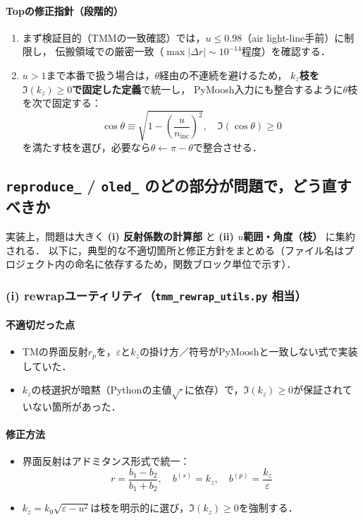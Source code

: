 \paragraph{Topの修正指針（段階的）}
\begin{enumerate}
\item まず検証目的（TMMの一致確認）では，\textbf{$u\le 0.98$}（air light-line手前）に制限し，
      伝搬領域での厳密一致（$\max|\Delta r|\sim 10^{-14}$程度）を確認する．
\item $u>1$まで本番で扱う場合は，$\theta$経由の不連続を避けるため，
      \textbf{$k_z$枝を$\Im(k_z)\ge 0$で固定した定義}で統一し，
      PyMoosh入力にも整合するように$\theta$枝を次で固定する：
      \[
      \cos\theta \equiv \sqrt{1-\left(\frac{u}{n_{\mathrm{inc}}}\right)^2},\quad
      \Im(\cos\theta)\ge 0
      \]
      を満たす枝を選び，必要なら$\theta\leftarrow\pi-\theta$で整合させる．
\end{enumerate}

\subsection{\texttt{reproduce\_\*\*} / \texttt{oled\_\*\*} のどの部分が問題で，どう直すべきか}

実装上，問題は大きく \textbf{(i) 反射係数の計算部} と \textbf{(ii) $u$範囲・角度（枝）} に集約される．
以下に，典型的な不適切箇所と修正方針をまとめる（ファイル名はプロジェクト内の命名に依存するため，関数ブロック単位で示す）．

\subsubsection{(i) rewrapユーティリティ（\texttt{tmm\_rewrap\_utils.py} 相当）}
\paragraph{不適切だった点}
\begin{itemize}
\item TMの界面反射$r_p$を，$\varepsilon$と$k_z$の掛け方／符号がPyMooshと一致しない式で実装していた．
\item $k_z$の枝選択が暗黙（Pythonの主値$\sqrt{\cdot}$に依存）で，$\Im(k_z)\ge 0$が保証されていない箇所があった．
\end{itemize}

\paragraph{修正方法}
\begin{itemize}
\item 界面反射はアドミタンス形式で統一：
      \[
      r=\frac{b_1-b_2}{b_1+b_2},\quad
      b^{(s)}=k_z,\quad b^{(p)}=\frac{k_z}{\varepsilon}
      \]
\item $k_z=k_0\sqrt{\varepsilon-u^2}$は枝を明示的に選び，$\Im(k_z)\ge 0$を強制する．
\end{itemize}

